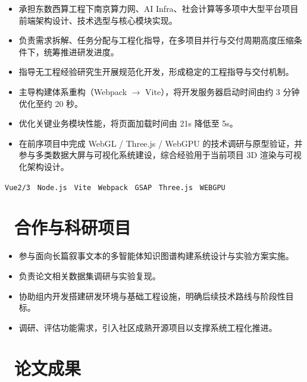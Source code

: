 \documentclass{resume}
\begin{document}
\begin{itemize}
  \item 承担东数西算工程下南京算力网、AI Infra、社会计算等多项中大型平台项目前端架构设计、技术选型与核心模块实现。
  \item 负责需求拆解、任务分配与工程化指导，在多项目并行与交付周期高度压缩条件下，统筹推进研发进度。
  \item 指导无工程经验研究生开展规范化开发，形成稳定的工程指导与交付机制。
  \item 主导构建体系重构（Webpack $\rightarrow$ Vite），将开发服务器启动时间由约 3 分钟优化至约 20 秒。
  \item 优化关键业务模块性能，将页面加载时间由 21s 降低至 5s。
  \item 在前序项目中完成 WebGL / Three.js / WebGPU 的技术调研与原型验证，并参与多类数据大屏与可视化系统建设，综合经验用于当前项目 3D 渲染与可视化架构设计。
\end{itemize}

\vspace{0.5em}
\texttt{Vue2/3} \textperiodcentered\
\texttt{Node.js} \textperiodcentered\
\texttt{Vite} \textperiodcentered\
\texttt{Webpack} \textperiodcentered\
\texttt{GSAP} \textperiodcentered\
\texttt{Three.js} \textperiodcentered\
\texttt{WEBGPU} \textperiodcentered\


\section{\faUsers\ 合作与科研项目}


\begin{itemize}
  \item 参与面向长篇叙事文本的多智能体知识图谱构建系统设计与实验方案实施。
  \item 负责论文相关数据集调研与实验复现。
  \item 协助组内开发搭建研发环境与基础工程设施，明确后续技术路线与阶段性目标。
  \item 调研、评估功能需求，引入社区成熟开源项目以支撑系统工程化推进。
\end{itemize}

\section{\faBook\ 论文成果}

\end{document}
